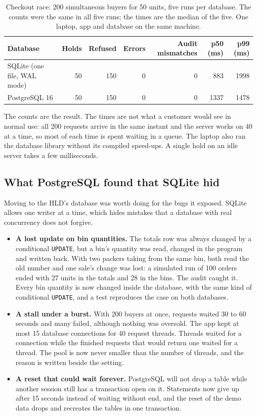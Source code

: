 \begin{table}[ht]
  \centering
  \footnotesize
  \begin{tabular}{@{}lrrrrrr@{}}
    \toprule
    Database & Holds & Refused & Errors & Audit mismatches & p50 (ms) & p99 (ms) \\
    \midrule
    SQLite (one file, WAL mode) & 50 & 150 & 0 & 0 & 883 & 1998 \\
    PostgreSQL 16 & 50 & 150 & 0 & 0 & 1337 & 1478 \\
    \bottomrule
  \end{tabular}
  \caption{Checkout race: 200 simultaneous buyers for 50 units, five runs per database. The counts were the same in
    all five runs; the times are the median of the five. One laptop, app and database on the same machine.}
  \label{tab:m1-race}
\end{table}

The counts are the result. The times are not what a customer would see in normal use: all 200 requests arrive in
the same instant and the server works on 40 at a time, so most of each time is spent waiting in a queue. The laptop
also ran the database library without its compiled speed-ups. A single hold on an idle server takes a few
milliseconds.

\subsection{What PostgreSQL found that SQLite hid}

Moving to the HLD's database was worth doing for the bugs it exposed. SQLite allows one writer at a time, which hides
mistakes that a database with real concurrency does not forgive.

\begin{itemize}
  \item \textbf{A lost update on bin quantities.} The totals row was always changed by a conditional
    \texttt{UPDATE}, but a bin's quantity was read, changed in the program and written back. With two packers
    taking from the same bin, both read the old number and one sale's change was lost: a simulated run of 100 orders
    ended with 27 units in the totals and 28 in the bins. The audit caught it. Every bin quantity is now changed
    inside the database, with the same kind of conditional \texttt{UPDATE}, and a test reproduces the case on both
    databases.
  \item \textbf{A stall under a burst.} With 200 buyers at once, requests waited 30 to 60 seconds and many failed,
    although nothing was oversold. The app kept at most 15 database connections for 40 request threads. Threads
    waited for a connection while the finished requests that would return one waited for a thread. The pool is now
    never smaller than the number of threads, and the reason is written beside the setting.
  \item \textbf{A reset that could wait forever.} PostgreSQL will not drop a table while another session still has
    a transaction open on it. Statements now give up after 15 seconds instead of waiting without end, and the
    reset of the demo data drops and recreates the tables in one transaction.
\end{itemize}

